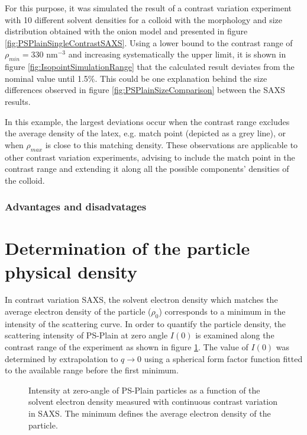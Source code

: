 For this purpose, it was simulated the result of a contrast variation experiment with 10 different solvent densities for a colloid with the morphology and size distribution obtained with the onion model and presented in figure \ref{fig:PSPlainSingleContrastSAXS}. Using a lower bound to the contrast range of $\rho_{min}=330$ nm$^{-3}$ and increasing systematically the upper limit, it is shown in figure \ref{fig:IsopointSimulationRange} that the calculated result deviates from the nominal value until 1.5$\%$. This could be one explanation behind the size differences observed in figure \ref{fig:PSPlainSizeComparison} between the SAXS results.

In this example, the largest deviations occur when the contrast range excludes the average density of the latex, e.g. match point (depicted as a grey line), or when $\rho_{max}$ is close to this matching density. These observations are applicable to other contrast variation experiments, advising to include the match point in the contrast range and extending it along all the possible components' densities of the colloid.
\subsubsection{Advantages and disadvatages}

\section{Determination of the particle physical density}
\label{sec:physical_density}
In contrast variation SAXS, the solvent electron density which matches the average electron density of the particle ($\rho_0$) corresponds to a minimum in the intensity of the scattering curve. In order to quantify the particle density, the scattering intensity of PS-Plain at zero angle $I(0)$ is examined along the contrast range of the experiment as shown in figure \ref{fig:PSPlainAverageDensity}. The value of $I(0)$ was determined by extrapolation to $q\rightarrow 0$ using a spherical form factor function fitted to the available range before the first minimum.

\begin{figure}
	\begin{center}
		
	\end{center}
	\caption{Intensity at zero-angle of PS-Plain particles as a function of the solvent electron density measured with continuous contrast variation in SAXS. The minimum defines the average electron density of the particle.}
	\label{fig:PSPlainAverageDensity}
\end{figure}


